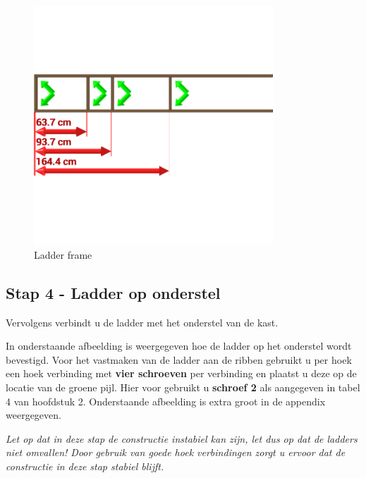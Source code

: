 \documentclass{article}
\begin{document}
\begin{figure}[h!]
    \centering
    \includegraphics[width=0.8\textwidth]{scene 3 - ladder.png}
    \caption{Ladder frame}
    \label{fig:stap 3}
\end{figure}

\clearpage
\newpage

\subsection{Stap 4 - Ladder op onderstel}

Vervolgens verbindt u de ladder met het onderstel van de kast.

In onderstaande afbeelding is weergegeven hoe de ladder op het onderstel wordt bevestigd. Voor het vastmaken van de ladder aan de ribben gebruikt u per hoek een hoek verbinding met \textbf{vier schroeven} per verbinding en plaatst u deze op de locatie van de groene pijl. Hier voor gebruikt u \textbf{schroef 2} als aangegeven in tabel 4 van hoofdstuk 2.
Onderstaande afbeelding is extra groot in de appendix weergegeven.

\begin{center}
\textit{Let op dat in deze stap de constructie instabiel kan zijn, let dus op dat de ladders niet omvallen! Door gebruik van goede hoek verbindingen zorgt u ervoor dat de constructie in deze stap stabiel blijft.}
\end{center}
\end{document}
